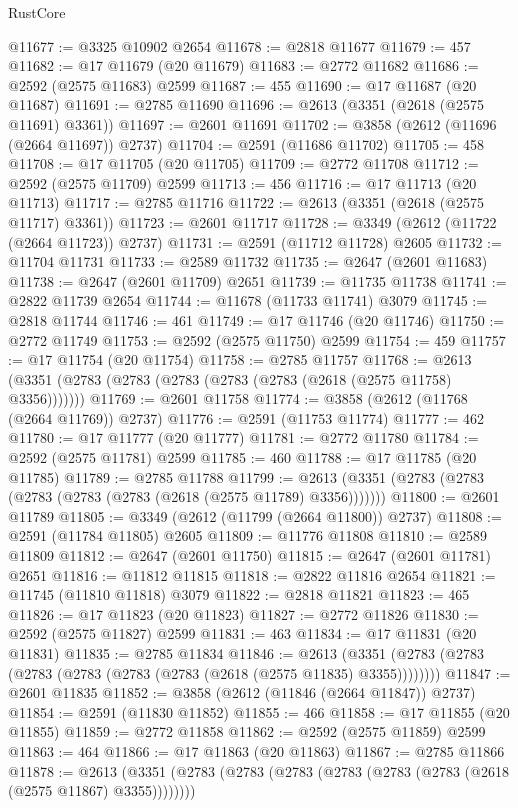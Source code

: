 \begin{lexlean}{RustCore}
\begin{coremodule}
@11677 := @3325 @10902 @2654
@11678 := @2818 @11677
@11679 := 457
@11682 := @17 @11679 (@20 @11679)
@11683 := @2772 @11682
@11686 := @2592 (@2575 @11683) @2599
@11687 := 455
@11690 := @17 @11687 (@20 @11687)
@11691 := @2785 @11690
@11696 := @2613 (@3351 (@2618 (@2575 @11691) @3361))
@11697 := @2601 @11691
@11702 := @3858 (@2612 (@11696 (@2664 @11697)) @2737)
@11704 := @2591 (@11686 @11702)
@11705 := 458
@11708 := @17 @11705 (@20 @11705)
@11709 := @2772 @11708
@11712 := @2592 (@2575 @11709) @2599
@11713 := 456
@11716 := @17 @11713 (@20 @11713)
@11717 := @2785 @11716
@11722 := @2613 (@3351 (@2618 (@2575 @11717) @3361))
@11723 := @2601 @11717
@11728 := @3349 (@2612 (@11722 (@2664 @11723)) @2737)
@11731 := @2591 (@11712 @11728) @2605
@11732 := @11704 @11731
@11733 := @2589 @11732
@11735 := @2647 (@2601 @11683)
@11738 := @2647 (@2601 @11709) @2651
@11739 := @11735 @11738
@11741 := @2822 @11739 @2654
@11744 := @11678 (@11733 @11741) @3079
@11745 := @2818 @11744
@11746 := 461
@11749 := @17 @11746 (@20 @11746)
@11750 := @2772 @11749
@11753 := @2592 (@2575 @11750) @2599
@11754 := 459
@11757 := @17 @11754 (@20 @11754)
@11758 := @2785 @11757
@11768 := @2613 (@3351 (@2783 (@2783 (@2783 (@2783 (@2783 (@2618 (@2575 @11758) @3356)))))))
@11769 := @2601 @11758
@11774 := @3858 (@2612 (@11768 (@2664 @11769)) @2737)
@11776 := @2591 (@11753 @11774)
@11777 := 462
@11780 := @17 @11777 (@20 @11777)
@11781 := @2772 @11780
@11784 := @2592 (@2575 @11781) @2599
@11785 := 460
@11788 := @17 @11785 (@20 @11785)
@11789 := @2785 @11788
@11799 := @2613 (@3351 (@2783 (@2783 (@2783 (@2783 (@2783 (@2618 (@2575 @11789) @3356)))))))
@11800 := @2601 @11789
@11805 := @3349 (@2612 (@11799 (@2664 @11800)) @2737)
@11808 := @2591 (@11784 @11805) @2605
@11809 := @11776 @11808
@11810 := @2589 @11809
@11812 := @2647 (@2601 @11750)
@11815 := @2647 (@2601 @11781) @2651
@11816 := @11812 @11815
@11818 := @2822 @11816 @2654
@11821 := @11745 (@11810 @11818) @3079
@11822 := @2818 @11821
@11823 := 465
@11826 := @17 @11823 (@20 @11823)
@11827 := @2772 @11826
@11830 := @2592 (@2575 @11827) @2599
@11831 := 463
@11834 := @17 @11831 (@20 @11831)
@11835 := @2785 @11834
@11846 := @2613 (@3351 (@2783 (@2783 (@2783 (@2783 (@2783 (@2783 (@2618 (@2575 @11835) @3355))))))))
@11847 := @2601 @11835
@11852 := @3858 (@2612 (@11846 (@2664 @11847)) @2737)
@11854 := @2591 (@11830 @11852)
@11855 := 466
@11858 := @17 @11855 (@20 @11855)
@11859 := @2772 @11858
@11862 := @2592 (@2575 @11859) @2599
@11863 := 464
@11866 := @17 @11863 (@20 @11863)
@11867 := @2785 @11866
@11878 := @2613 (@3351 (@2783 (@2783 (@2783 (@2783 (@2783 (@2783 (@2618 (@2575 @11867) @3355))))))))

\end{coremodule}
\end{lexlean}
